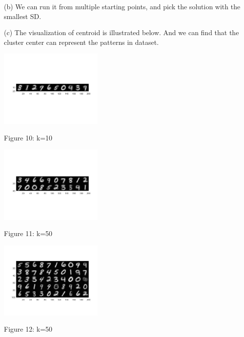 \documentclass[11pt]{article} %
\begin{document}
(b) 
We can run it from multiple starting points, and pick the solution with the smallest SD.

(c)
The visualization of centroid is illustrated below. And we can find that the cluster center can represent the patterns in dataset.

\begin{center}
\includegraphics[width=2in]{kmeans_k10.jpg}  %

Figure 10: k=10
\end{center}

\begin{center}
\includegraphics[width=2in]{kmeans_k20.jpg}  %

Figure 11: k=50
\end{center}

\begin{center}
\includegraphics[width=2in]{kmeans_k50.jpg}  %

Figure 12: k=50
\end{center}
\end{document}
